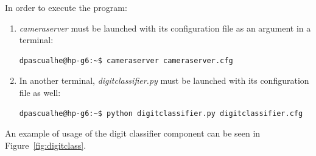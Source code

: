 In order to execute the program:
\begin{enumerate}
	\item \textit{cameraserver} must be launched with its configuration file as an argument in a terminal:
	\begin{Verbatim}[frame=single]
dpascualhe@hp-g6:~$ cameraserver cameraserver.cfg
	\end{Verbatim}
	
	\item In another terminal, \textit{digitclassifier.py} must be launched with its configuration file as well:
	\begin{Verbatim}[frame=single]
dpascualhe@hp-g6:~$ python digitclassifier.py digitclassifier.cfg
	\end{Verbatim}
\end{enumerate}

An example of usage of the digit classifier component can be seen in Figure~\ref{fig:digitclass}.